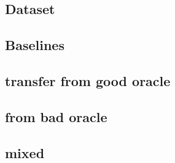 \subsection{Dataset}

\subsection{Baselines}

\subsection{transfer from good oracle}

\subsection{from bad oracle}

\subsection{mixed}

